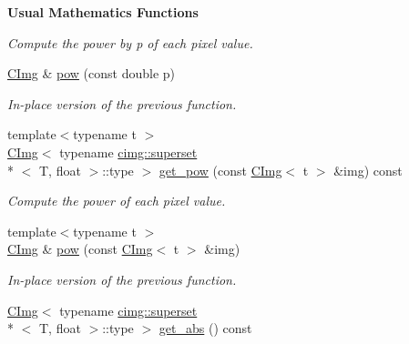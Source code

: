 \begin{Indent}{\bf Usual Mathematics Functions}
\begin{DoxyCompactItemize}
\begin{DoxyCompactList}\small\item\em Compute the power by p of each pixel value. \end{DoxyCompactList}\item 
\hypertarget{structcimg__library_1_1_c_img_a067f4006eacbc322ce61bafebe7bd340}{\hyperlink{structcimg__library_1_1_c_img}{C\-Img} \& \hyperlink{structcimg__library_1_1_c_img_a067f4006eacbc322ce61bafebe7bd340}{pow} (const double p)}\label{structcimg__library_1_1_c_img_a067f4006eacbc322ce61bafebe7bd340}

\begin{DoxyCompactList}\small\item\em In-\/place version of the previous function. \end{DoxyCompactList}\item 
\hypertarget{structcimg__library_1_1_c_img_a5d4055300ca6c21320603bbf92911f6a}{{\footnotesize template$<$typename t $>$ }\\\hyperlink{structcimg__library_1_1_c_img}{C\-Img}$<$ typename \hyperlink{structcimg__library_1_1cimg_1_1superset}{cimg\-::superset}\\*
$<$ T, float $>$\-::type $>$ \hyperlink{structcimg__library_1_1_c_img_a5d4055300ca6c21320603bbf92911f6a}{get\-\_\-pow} (const \hyperlink{structcimg__library_1_1_c_img}{C\-Img}$<$ t $>$ \&img) const }\label{structcimg__library_1_1_c_img_a5d4055300ca6c21320603bbf92911f6a}

\begin{DoxyCompactList}\small\item\em Compute the power of each pixel value. \end{DoxyCompactList}\item 
\hypertarget{structcimg__library_1_1_c_img_a24216190fbacb7bfef17793eda3224c4}{{\footnotesize template$<$typename t $>$ }\\\hyperlink{structcimg__library_1_1_c_img}{C\-Img} \& \hyperlink{structcimg__library_1_1_c_img_a24216190fbacb7bfef17793eda3224c4}{pow} (const \hyperlink{structcimg__library_1_1_c_img}{C\-Img}$<$ t $>$ \&img)}\label{structcimg__library_1_1_c_img_a24216190fbacb7bfef17793eda3224c4}

\begin{DoxyCompactList}\small\item\em In-\/place version of the previous function. \end{DoxyCompactList}\item 
\hypertarget{structcimg__library_1_1_c_img_a85039c26595bd4063b459260075d9526}{\hyperlink{structcimg__library_1_1_c_img}{C\-Img}$<$ typename \hyperlink{structcimg__library_1_1cimg_1_1superset}{cimg\-::superset}\\*
$<$ T, float $>$\-::type $>$ \hyperlink{structcimg__library_1_1_c_img_a85039c26595bd4063b459260075d9526}{get\-\_\-abs} () const }\label{structcimg__library_1_1_c_img_a85039c26595bd4063b459260075d9526}


\end{DoxyCompactItemize}
\end{Indent}
